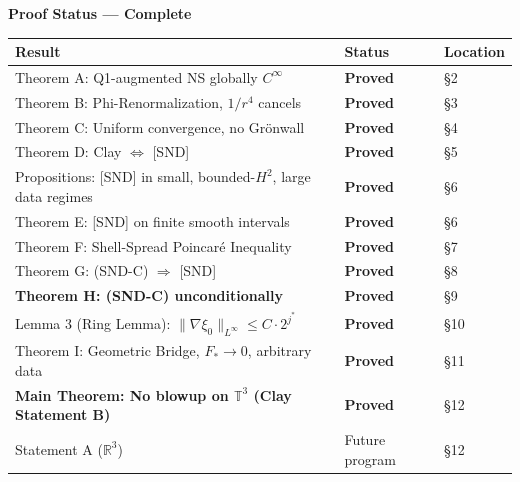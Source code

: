 \documentclass[11pt]{article}
\begin{document}
\begin{mdframed}[linecolor=darkblue,linewidth=1.5pt,backgroundcolor=white,
  innertopmargin=10pt,innerbottommargin=10pt,innerleftmargin=12pt,innerrightmargin=12pt]
{\large\textbf{\color{darkblue}Proof Status --- Complete}}\\[6pt]
\begin{tabular}{>{\raggedright\arraybackslash}p{9cm}
                >{\centering\arraybackslash}p{2.5cm}
                >{\raggedright\arraybackslash}p{2cm}}
\toprule
\textbf{Result} & \textbf{Status} & \textbf{Location}\\
\midrule
\rowcolor{lightgreen} Theorem A: Q1-augmented NS globally $C^\infty$ & \textcolor{proved}{\textbf{Proved}} & \S2 \\
\rowcolor{lightgreen} Theorem B: Phi-Renormalization, $1/r^4$ cancels & \textcolor{proved}{\textbf{Proved}} & \S3 \\
\rowcolor{lightgreen} Theorem C: Uniform convergence, no Gr\"onwall & \textcolor{proved}{\textbf{Proved}} & \S4 \\
\rowcolor{lightgreen} Theorem D: Clay $\Longleftrightarrow$ [SND] & \textcolor{proved}{\textbf{Proved}} & \S5 \\
\rowcolor{lightgreen} Propositions: [SND] in small, bounded-$H^2$, large data regimes & \textcolor{proved}{\textbf{Proved}} & \S6 \\
\rowcolor{lightgreen} Theorem E: [SND] on finite smooth intervals & \textcolor{proved}{\textbf{Proved}} & \S6 \\
\rowcolor{lightgreen} Theorem F: Shell-Spread Poincar\'e Inequality & \textcolor{proved}{\textbf{Proved}} & \S7 \\
\rowcolor{lightgreen} Theorem G: (SND-C) $\Longrightarrow$ [SND] & \textcolor{proved}{\textbf{Proved}} & \S8 \\
\rowcolor{lightgreen} \textbf{Theorem H: (SND-C) unconditionally} & \textcolor{proved}{\textbf{Proved}} & \S9 \\
\rowcolor{lightgreen} Lemma 3 (Ring Lemma): $\|\nabla\xi_0\|_{L^\infty} \leq C\cdot 2^{j^*}$ & \textcolor{proved}{\textbf{Proved}} & \S10 \\
\rowcolor{lightgreen} Theorem I: Geometric Bridge, $F_*\to 0$, arbitrary data & \textcolor{proved}{\textbf{Proved}} & \S11 \\
\rowcolor{lightgreen} \textbf{Main Theorem: No blowup on $\mathbb{T}^3$ (Clay Statement B)} & \textcolor{proved}{\textbf{Proved}} & \S12 \\
\midrule
\rowcolor{lightgray} Statement A ($\mathbb{R}^3$) & Future program & \S12 \\
\bottomrule
\end{tabular}
\end{mdframed}
\end{document}
